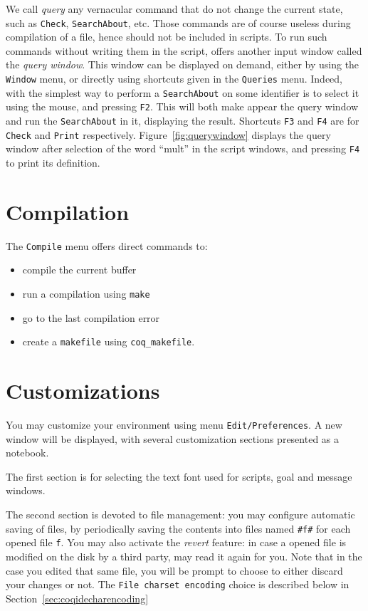 We call \emph{query} any vernacular command that do not change the
current state, such as \verb|Check|, \verb|SearchAbout|, etc. Those
commands are of course useless during compilation of a file, hence
should not be included in scripts. To run such commands without
writing them in the script, \CoqIDE{} offers another input window
called the \emph{query window}. This window can be displayed on
demand, either by using the \texttt{Window} menu, or directly using
shortcuts given in the \texttt{Queries} menu. Indeed, with \CoqIDE{}
the simplest way to perform a \texttt{SearchAbout} on some identifier
is to select it using the mouse, and pressing \verb|F2|. This will
both make appear the query window and run the \texttt{SearchAbout} in
it, displaying the result. Shortcuts \verb|F3| and \verb|F4| are for
\verb|Check| and \verb|Print| respectively.
Figure~\ref{fig:querywindow} displays the query window after selection
of the word ``mult'' in the script windows, and pressing \verb|F4| to
print its definition.

\section{Compilation}

The \verb|Compile| menu offers direct commands to:
\begin{itemize}
\item compile the current buffer
\item run a compilation using \verb|make|
\item go to the last compilation error
\item create a \verb|makefile| using \verb|coq_makefile|.
\end{itemize}

\section{Customizations}

You may customize your environment using menu
\texttt{Edit/Preferences}. A new window will be displayed, with
several customization sections presented as a notebook. 

The first section is for selecting the text font used for scripts, goal
and message windows. 

The second section is devoted to file management: you may
configure automatic saving of files, by periodically saving the
contents into files named \verb|#f#| for each opened file
\verb|f|. You may also activate the \emph{revert} feature: in case a
opened file is modified on the disk by a third party, \CoqIDE{} may read
it again for you. Note that in the case you edited that same file, you
will be prompt to choose to either discard your changes or not. The
\texttt{File charset encoding} choice is described below in
Section~\ref{sec:coqidecharencoding}
 


